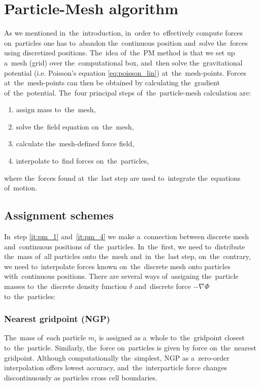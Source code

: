 \section{Particle-Mesh algorithm}
\label{sec:PM}
As we mentioned in~the~introduction, in~order to~effectively compute forces on~particles one has to~abandon the~continuous position and~solve the~forces using discretized positions. The~idea of~the~PM method is that we set up a~mesh (grid) over the~computational box, and~then solve the~gravitational potential (i.e. Poisson’s equation \eqref{eq:poisson_lin}) at~the~mesh-points. Forces at~the~mesh-points can then be obtained by calculating the~gradient of~the~potential. The~four principal steps of~the~particle-mesh calculation are:
\begin{enumerate}
    \item assign mass to~the~mesh,
    \label{it:pm_1}
    \item solve the~field equation on~the~mesh,
    \label{it:pm_2}
    \item calculate the~mesh-defined force field,
    \label{it:pm_3}
    \item interpolate to~find forces on~the~particles,
    \label{it:pm_4}
\end{enumerate}
where the~forces found at~the~last step are used to~integrate the~equations of~motion.
\subsection{Assignment schemes}
In~step \ref{it:pm_1} and~\ref{it:pm_4} we make a~connection between discrete mesh and~continuous positions of~the~particles. In~the~first, we need to~distribute the~mass of~all particles onto the~mesh and~in~the~last step, on~the~contrary, we need to~interpolate forces known on~the~discrete mesh onto particles with~continuous positions. There are several ways of~assigning the~particle masses to~the~discrete density function $\delta$ and~discrete force $-\nabla\Phi$ to~the~particles:

\subsubsection{Nearest gridpoint (NGP)}
The~mass of~each particle $m_i$ is assigned as a~whole to~the~gridpoint closest to~the~particle. Similarly, the~force on~particles is given by force on~the~nearest gridpoint. Although computationally the~simplest, NGP as a~zero-order interpolation offers lowest accuracy, and~the~interparticle force changes discontinuously as particles cross cell boundaries.

